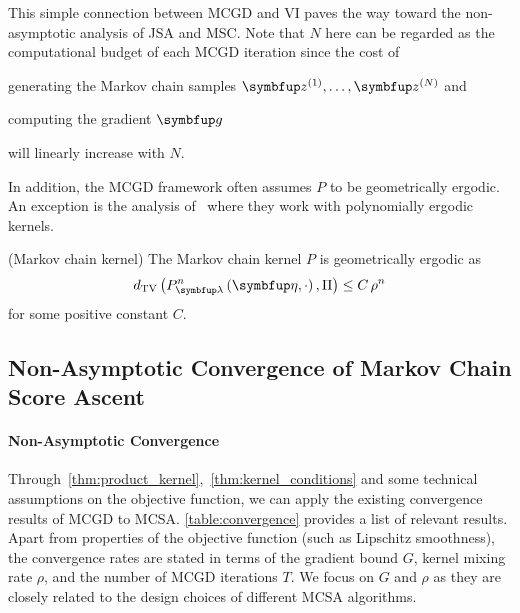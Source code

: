 This simple connection between MCGD and VI paves the way toward the non-asymptotic analysis of JSA and MSC.
Note that \(N\) here can be regarded as the computational budget of each MCGD iteration since the cost of
\begin{enumerate*}[label=\textbf{(\roman*)}]
  \item generating the Markov chain samples \(\vz^{(1)}, \ldots, \vz^{(N)}\) and
  \item computing the gradient \(\vg\)
\end{enumerate*}
will linearly increase with \(N\).

In addition, the MCGD framework often assumes \(P\) to be geometrically ergodic.
An exception is the analysis of~\citet{debavelaere_convergence_2021} where they work with polynomially ergodic kernels.
\begin{assumption}{(Markov chain kernel)}\label{thm:kernel_conditions}
\vspace{-0.05in}
  The Markov chain kernel \(P\) is geometrically ergodic as
  {%
  \[
  \DTV{P_{\vlambda}^{n}\left(\veta, \cdot\right)}{ \Pi } \leq C \, \rho^{n}
  \]
  }
  for some positive constant \(C\).
\end{assumption}

\vspace{-2ex}
\subsection{Non-Asymptotic Convergence of Markov Chain Score Ascent}%
\vspace{-1.5ex}
\paragraph{Non-Asymptotic Convergence}
Through~\cref{thm:product_kernel},~\cref{thm:kernel_conditions} and some technical assumptions on the objective function, we can apply the existing convergence results of MCGD to MCSA.
\cref{table:convergence} provides a list of relevant results.
Apart from properties of the objective function (such as Lipschitz smoothness), the convergence rates are stated in terms of the gradient bound \(G\), kernel mixing rate \(\rho\), and the number of MCGD iterations \(T\).
We focus on \(G\) and \(\rho\) as they are closely related to the design choices of different MCSA algorithms.

\vspace{-0.1in}

